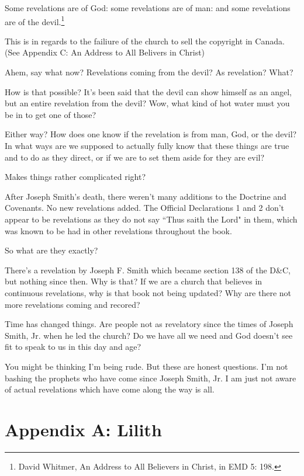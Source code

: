 \documentclass{article}
\begin{document}
\begin{displayquote}
Some revelations are of God: 
some revelations are of man: 
and some revelations are of the devil.\footnote{David Whitmer, 
An Address to All Believers in Christ, in EMD 5: 198.}
\end{displayquote}

This is in regards to the failiure of the church to sell the copyright in
Canada. (See Appendix C: An Address to All Belivers in Christ)

Ahem, say what now? Revelations coming from the devil? As revelation? What?

How is that possible? It's been said that the devil can show himself as an 
angel, but an entire revelation from the devil? Wow, what kind of hot water
must you be in to get one of those?

Either way? How does one know if the revelation is from man, God, or the devil?
In what ways are we supposed to actually fully know that these things are
true and to do as they direct, or if we are to set them aside for they are evil?

Makes things rather complicated right?

After Joseph Smith's death, there weren't many additions to the Doctrine and
Covenants. No new revelations added. The Official Declarations 1 and 2 don't
appear to be revelations as they do not say ``Thus saith the Lord" in them,
which was known to be had in other revelations throughout the book.

So what are they exactly?

There's a revelation by Joseph F. Smith which became section 138 of the D\&C,
but nothing since then. Why is that? If we are a church that believes in
continuous revelations, why is that book not being updated? Why are there
not more revelations coming and recored?

Time has changed things. Are people not as revelatory since the times of
Joseph Smith, Jr. when he led the church? Do we have all we need and God doesn't
see fit to speak to us in this day and age?

You might be thinking I'm being rude. But these are honest questions. I'm not
bashing the prophets who have come since Joseph Smith, Jr. I am just not aware
of actual revelations which have come along the way is all.

\newpage

\section{Appendix A: Lilith}
\end{document}
